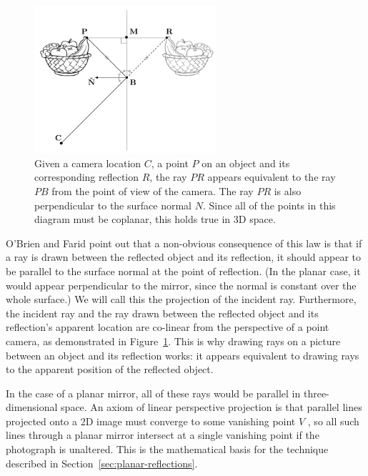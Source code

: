 \documentclass{thesis}
\begin{document}
\begin{figure}
	\centering
    	\includegraphics[width=0.6\textwidth]{normal-reflection}
	\caption{Given a camera location $C$, a point $P$ on an object and its corresponding reflection $R$, the ray $PR$ appears equivalent to the ray $PB$ from the point of view of the camera. The ray $PR$ is also perpendicular to the surface normal $N$. Since all of the points in this diagram must be coplanar, this holds true in 3D space. \cite[Fig.~2]{obrien12}}
	\label{normal-reflection}
\end{figure}

O'Brien and Farid point out that a non-obvious consequence of this law is that if a ray is drawn between the reflected object and its reflection, it should appear to be parallel to the surface normal at the point of reflection. (In the planar case, it would appear perpendicular to the mirror, since the normal is constant over the whole surface.) We will call this the projection of the incident ray. Furthermore, the incident ray and the ray drawn between the reflected object and its reflection's apparent location are co-linear from the perspective of a point camera, as demonstrated in Figure~\ref{normal-reflection}. This is why drawing rays on a picture between an object and its reflection works: it appears equivalent to drawing rays to the apparent position of the reflected object.

In the case of a planar mirror, all of these rays would be parallel in three-dimensional space.\nocite{obrien12} An axiom of linear perspective projection is that parallel lines projected onto a 2D image must converge to some vanishing point $V$ \cite[p.~2]{hartley}, so all such lines through a planar mirror intersect at a single vanishing point if the photograph is unaltered. This is the mathematical basis for the technique described in Section~\ref{sec:planar-reflections}.
\end{document}
